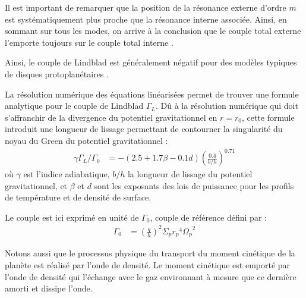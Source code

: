 \bigskip

Il est important de remarquer que la position de la résonance externe d'ordre $m$ est systématiquement plus proche que la résonance interne associée. Ainsi, en sommant sur tous les modes, on arrive à la conclusion que le couple total externe l'emporte toujours sur le couple total interne \citep{ward1997protoplanet}. 

Ainsi, le couple de Lindblad est généralement négatif pour des modèles typiques de disques protoplanétaires \citep{ward1997protoplanet}.

La résolution numérique des équations linéarisées permet de trouver une formule analytique pour le couple de Lindblad $\Gamma_L$. Dû à la résolution numérique qui doit s'affranchir de la divergence du potentiel gravitationnel en $r=r_0$, cette formule introduit une longueur de lissage permettant de contourner la singularité du noyau du Green du potentiel gravitationnel \citep[eq. (14)]{paardekooper2010torque} : 
\begin{align}
\gamma \Gamma_L/\Gamma_0 &= - \left(2.5 +1.7\beta -0.1d\right) \left(\frac{0.4}{b/h}\right)^{0.71}\label{eq:lindblad-torque}
\end{align}
où $\gamma$ est l'indice adiabatique, $b/h$ la longueur de lissage du potentiel gravitationnel, et $\beta$ et $d$ sont les exposants des lois de puissance pour les profils de température et de densité de surface. 

Le couple est ici exprimé en unité de $\Gamma_0$, couple de référence défini par : 
\begin{align}
\Gamma_0 &= \left(\frac{q}{h}\right)^2\Sigma_p {r_p}^4 {\Omega_p}^2
\end{align}

Notons aussi que le processus physique du transport du moment cinétique de la planète est réalisé par l'onde de densité. Le moment cinétique est emporté par l'onde de densité qui l'échange avec le gaz environnant à mesure que ce dernière amorti et dissipe l'onde.

